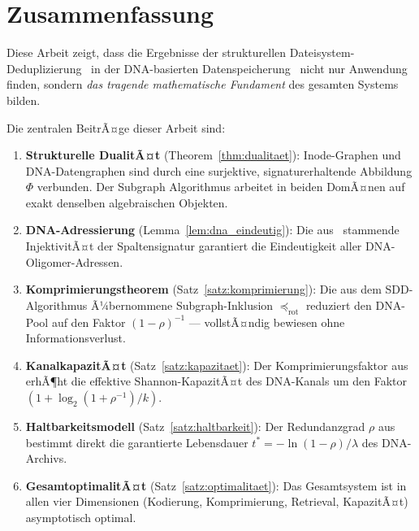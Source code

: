﻿\documentclass[a4paper,12pt]{article}
\theoremstyle{definition}
\theoremstyle{plain}
\begin{document}
\section{Zusammenfassung}
\label{sec:zusammenfassung}

Diese Arbeit zeigt, dass die Ergebnisse der strukturellen
Dateisystem-Deduplizierung~\cite{dusgraph} in der DNA-basierten
Datenspeicherung~\cite{dnastor} nicht nur Anwendung finden, sondern
\emph{das tragende mathematische Fundament} des gesamten Systems bilden.

Die zentralen BeitrÃ¤ge dieser Arbeit sind:

\begin{enumerate}
  \item \textbf{Strukturelle DualitÃ¤t} (Theorem~\ref{thm:dualitaet}):
        Inode-Graphen und DNA-Datengraphen sind durch eine surjektive,
        signaturerhaltende Abbildung $\Phi$ verbunden.  Der Subgraph Algorithmus
        arbeitet in beiden DomÃ¤nen auf exakt denselben algebraischen Objekten.

  \item \textbf{DNA-Adressierung} (Lemma~\ref{lem:dna_eindeutig}):
        Die aus~\cite{dusgraph} stammende InjektivitÃ¤t der Spaltensignatur
        garantiert die Eindeutigkeit aller DNA-Oligomer-Adressen.

  \item \textbf{Komprimierungstheorem} (Satz~\ref{satz:komprimierung}):
        Die aus dem SDD-Algorithmus Ã¼bernommene Subgraph-Inklusion
        $\preceq_{\mathrm{rot}}$ reduziert den DNA-Pool auf den
        Faktor $(1-\rho)^{-1}$ --- vollstÃ¤ndig bewiesen ohne Informationsverlust.

  \item \textbf{KanalkapazitÃ¤t} (Satz~\ref{satz:kapazitaet}):
        Der Komprimierungsfaktor aus~\cite{dusgraph} erhÃ¶ht die effektive
        Shannon-KapazitÃ¤t des DNA-Kanals um den Faktor
        $(1 + \log_2(1+\rho^{-1})/k)$.

  \item \textbf{Haltbarkeitsmodell} (Satz~\ref{satz:haltbarkeit}):
        Der Redundanzgrad $\rho$ aus~\cite{dusgraph} bestimmt direkt die
        garantierte Lebensdauer $t^* = -\ln(1-\rho)/\lambda$ des DNA-Archivs.

  \item \textbf{GesamtoptimalitÃ¤t} (Satz~\ref{satz:optimalitaet}):
        Das Gesamtsystem ist in allen vier Dimensionen (Kodierung,
        Komprimierung, Retrieval, KapazitÃ¤t) asymptotisch optimal.


\end{enumerate}
\end{document}
